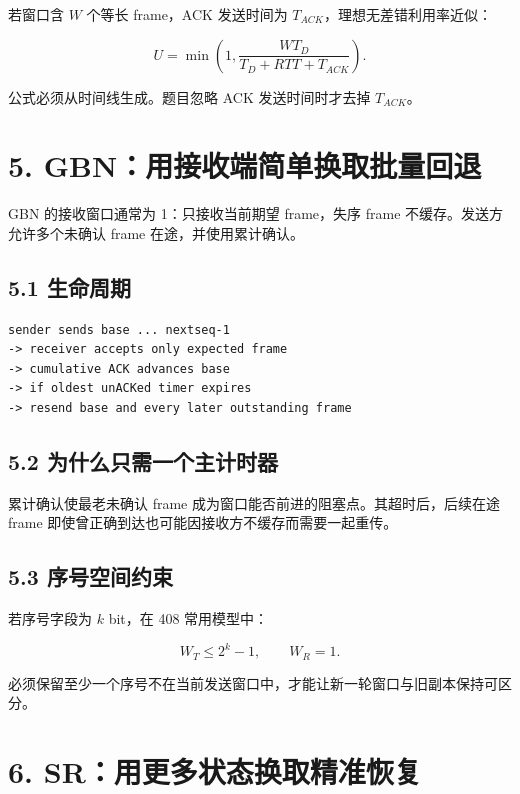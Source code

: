 \documentclass[UTF8,fontset=none,11pt,a4paper]{ctexart}
\begin{document}
若窗口含 \(W\) 个等长 frame，ACK 发送时间为
\(T_{ACK}\)，理想无差错利用率近似：

\[
U=\min\left(1,\frac{W T_D}{T_D+RTT+T_{ACK}}\right).
\]

公式必须从时间线生成。题目忽略 ACK 发送时间时才去掉 \(T_{ACK}\)。

\section{5.
GBN：用接收端简单换取批量回退}\label{5-gbnux7528ux63a5ux6536ux7aefux7b80ux5355ux6362ux53d6ux6279ux91cfux56deux9000}

GBN 的接收窗口通常为 1：只接收当前期望 frame，失序 frame
不缓存。发送方允许多个未确认 frame 在途，并使用累计确认。

\subsection{5.1 生命周期}\label{51-ux751fux547dux5468ux671f}

\begin{lstlisting}
sender sends base ... nextseq-1
-> receiver accepts only expected frame
-> cumulative ACK advances base
-> if oldest unACKed timer expires
-> resend base and every later outstanding frame
\end{lstlisting}

\subsection{5.2
为什么只需一个主计时器}\label{52-ux4e3aux4ec0ux4e48ux53eaux9700ux4e00ux4e2aux4e3bux8ba1ux65f6ux5668}

累计确认使最老未确认 frame 成为窗口能否前进的阻塞点。其超时后，后续在途
frame 即使曾正确到达也可能因接收方不缓存而需要一起重传。

\subsection{5.3
序号空间约束}\label{53-ux5e8fux53f7ux7a7aux95f4ux7ea6ux675f}

若序号字段为 \(k\) bit，在 408 常用模型中：

\[
W_T\le 2^k-1,
\qquad W_R=1.
\]

必须保留至少一个序号不在当前发送窗口中，才能让新一轮窗口与旧副本保持可区分。

\section{6.
SR：用更多状态换取精准恢复}\label{6-srux7528ux66f4ux591aux72b6ux6001ux6362ux53d6ux7cbeux51c6ux6062ux590d}
\end{document}
